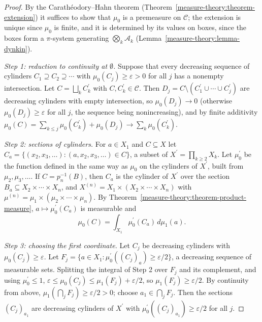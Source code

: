 \begin{proof}
By the Carath\'eodory--Hahn theorem (Theorem~\ref{measure-theory:theorem-extension}) it suffices to show that $\mu_0$ is a premeasure on $\mathcal{C}$; the extension is unique since $\mu_0$ is finite, and it is
determined by its values on boxes, since the boxes form a $\pi$-system generating $\bigotimes_k\mathcal{A}_k$ (Lemma~\ref{measure-theory:lemma-dynkin}).

\emph{Step 1: reduction to continuity at $\emptyset$.} Suppose that every decreasing sequence of cylinders $C_1 \supseteq C_2 \supseteq \cdots$ with $\mu_0(C_j) \geq \varepsilon > 0$ for all $j$ has a nonempty
intersection. Let $C = \bigsqcup_kC^{\prime}_k$ with $C, C^{\prime}_k \in \mathcal{C}$. Then $D_j = C \setminus (C^{\prime}_1 \cup \cdots \cup C^{\prime}_j)$ are decreasing cylinders with empty intersection, so
$\mu_0(D_j) \to 0$ (otherwise $\mu_0(D_j) \geq \varepsilon$ for all $j$, the sequence being nonincreasing), and by finite additivity $\mu_0(C) = \sum_{k \leq j}\mu_0(C^{\prime}_k) + \mu_0(D_j) \to \sum_k\mu_0(C^{\prime}_k)$.

\emph{Step 2: sections of cylinders.} For $a \in X_1$ and $C \subseteq X$ let $C_a = \{(x_2, x_3, \ldots) : (a, x_2, x_3, \ldots) \in C\}$, a subset of $X^{\prime} = \prod_{k \geq 2}X_k$. Let $\mu^{\prime}_0$ be the
function defined in the same way as $\mu_0$ on the cylinders of $X^{\prime}$, built from $\mu_2, \mu_3, \ldots$. If $C = p_n^{-1}(B)$, then $C_a$ is the cylinder of $X^{\prime}$ over the section
$B_a \subseteq X_2 \times \cdots \times X_n$, and $X^{(n)} = X_1 \times (X_2 \times \cdots \times X_n)$ with $\mu^{(n)} = \mu_1 \times (\mu_2 \times \cdots \times \mu_n)$. By
Theorem~\ref{measure-theory:theorem-product-measure}, $a \mapsto \mu^{\prime}_0(C_a)$ is measurable and
\[
\mu_0(C) = \int_{X_1}\mu^{\prime}_0(C_a)\,d\mu_1(a).
\]

\emph{Step 3: choosing the first coordinate.} Let $C_j$ be decreasing cylinders with $\mu_0(C_j) \geq \varepsilon$. Let $F_j = \{a \in X_1 : \mu^{\prime}_0((C_j)_a) \geq \varepsilon/2\}$, a decreasing sequence of
measurable sets. Splitting the integral of Step 2 over $F_j$ and its complement, and using $\mu^{\prime}_0 \leq 1$,
$\varepsilon \leq \mu_0(C_j) \leq \mu_1(F_j) + \varepsilon/2$, so $\mu_1(F_j) \geq \varepsilon/2$. By continuity from above, $\mu_1(\bigcap_jF_j) \geq \varepsilon/2 > 0$; choose $a_1 \in \bigcap_jF_j$.
Then the sections $(C_j)_{a_1}$ are decreasing cylinders of $X^{\prime}$ with $\mu^{\prime}_0((C_j)_{a_1}) \geq \varepsilon/2$ for all $j$.


\end{proof}
